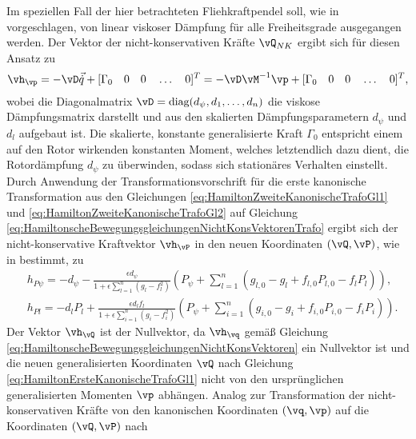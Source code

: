 %
%
%
%
%
Im speziellen Fall der hier betrachteten Fliehkraftpendel soll, wie in \cite{Mayet:Tautochronic} vorgeschlagen, 
von linear viskoser Dämpfung für alle Freiheitsgrade ausgegangen werden.
Der Vektor der nicht-konservativen Kräfte $\vQ_{NK}$ ergibt sich für diesen Ansatz zu
\begin{equation}
	\vh_{\vp} = - \vD \vec{\dot{q}} + [\Gamma_0 \quad 0 \quad 0 \quad \dots \quad 0]^T
				= - \vD \vM^{-1} \vp + [\Gamma_0 \quad 0 \quad 0 \quad \dots \quad 0]^T
				,
	\label{eq:HamiltonscheBewegungsgleichungenNichtKonsVektorenExpl}
\end{equation}
wobei die Diagonalmatrix $\vD = \text{diag}(d_{\psi},d_1, \dots, d_n)$ die viskose Dämpfungsmatrix darstellt 
und aus den skalierten Dämpfungsparametern $d_{\psi}$ und $d_l$ aufgebaut ist.
Die skalierte, konstante generalisierte Kraft $\Gamma_0$ entspricht einem auf den Rotor wirkenden konstanten Moment, 
welches letztendlich dazu dient, die Rotordämpfung $d_{\psi}$ zu überwinden, sodass sich stationäres Verhalten einstellt.
Durch Anwendung der Transformationsvorschrift 
für die erste kanonische Transformation aus den Gleichungen \eqref{eq:HamiltonZweiteKanonischeTrafoGl1} und  \eqref{eq:HamiltonZweiteKanonischeTrafoGl2}
auf Gleichung \eqref{eq:HamiltonscheBewegungsgleichungenNichtKonsVektorenTrafo} 
ergibt sich der nicht-konservative Kraftvektor $\vh_{\vP}$ in den neuen Koordinaten $(\vQ, \vP)$, wie in \cite{Mayet:Tautochronic} bestimmt, zu
%
%
%
\begin{align}
	&h_{P\psi} =  -d_{\psi} - \frac{\epsilon d_{\psi}}{1+\epsilon \sum_{l=1}^n \left( g_l - f_l^2 \right) }  
								\left( P_{\psi} + \sum_{l=1}^n \left( g_{l,0} - g_l + f_{l,0} P_{l,0} - f_l P_l \right) \right) , \\
	&h_{Pl}		 =	-d_l P_l + \frac{\epsilon d_l f_l}{1+\epsilon \sum_{i=1}^n \left( g_i - f_i^2 \right) }  
								\left( P_{\psi} + \sum_{i=1}^n \left( g_{i,0} - g_i + f_{i,0} P_{i,0} - f_i P_i \right) \right) .
	\label{eq:HamiltonNichtKonKraeftInQPKorrd}
\end{align}
Der Vektor $\vh_{\vQ}$ ist der Nullvektor, da $\vh_{\vq}$ gemäß Gleichung \eqref{eq:HamiltonscheBewegungsgleichungenNichtKonsVektoren} 
ein Nullvektor ist und die neuen generalisierten Koordinaten $\vQ$ nach Gleichung \eqref{eq:HamiltonErsteKanonischeTrafoGl1} 
nicht von den ursprünglichen generalisierten Momenten $\vp$ abhängen. 
Analog zur Transformation der nicht-konservativen Kräfte von den kanonischen Koordinaten $(\vq, \vp)$ auf die Koordinaten $(\vQ, \vP)$ nach
